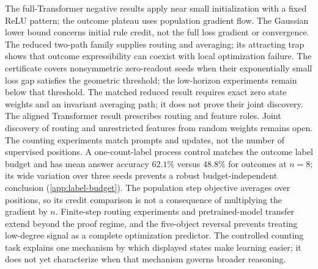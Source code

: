 The full-Transformer negative results apply near small initialization with a fixed
ReLU pattern; the outcome plateau uses population gradient flow.
The Gaussian lower bound concerns initial rule credit, not the full loss gradient
or convergence. The reduced two-path family supplies routing and averaging;
its attracting trap shows that outcome expressibility can coexist with local
optimization failure. The certificate covers nonsymmetric zero-readout seeds when their exponentially
small loss gap satisfies the geometric threshold; the low-horizon experiments
remain below that threshold. The matched reduced result requires exact zero state
weights and an invariant averaging path; it does not prove their joint discovery.
The aligned Transformer result prescribes routing and feature roles. Joint discovery
of routing and unrestricted features from random weights remains open.
The counting experiments match prompts and updates, not the number of supervised
positions. A one-count-label process control matches the outcome label budget and has mean
answer accuracy $62.1\%$ versus $48.8\%$ for outcomes at $n=8$; its wide variation
over three seeds prevents a robust budget-independent conclusion
(\cref{app:label-budget}). The population step objective averages
over positions, so its credit comparison is not a consequence of multiplying the gradient by $n$.
Finite-step routing experiments and pretrained-model transfer extend beyond the proof regime,
and the five-object reversal prevents treating low-degree signal as a complete optimization
predictor. The controlled counting task explains one mechanism by which displayed states
make learning easier; it does not yet characterize when that mechanism governs broader reasoning.
